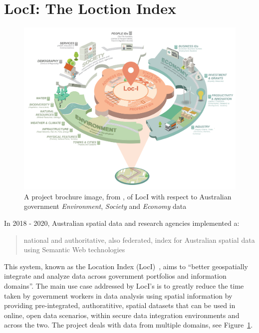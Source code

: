 \documentclass[runningheads]{llncs}
\begin{document}
\section{LocI: The Loction Index}\label{sec:loci}

\begin{figure}[htb]
    \centering
    \includegraphics[width=\linewidth]{images/loci-brochure.png}
    \caption{A project brochure image, from \cite{car_location_2019}, of LocI with respect to
    Australian government \textit{Environment}, \textit{Society} and \textit{Economy} data}
    \label{fig:loci-brochure}
\end{figure}

In 2018 - 2020, Australian spatial data and research agencies implemented a:

\begin{quotation}
    national and authoritative, also federated, index for Australian spatial data using Semantic Web technologies~\cite{car_location_2019}
\end{quotation}

This system, known as the Location Index (LocI)~\cite{car_location_2019}, aims to ``better geospatially integrate and analyze data across 
government portfolios and information domains''. The main use case addressed by LocI's is to greatly reduce the time taken by government 
workers in data analysis using spatial information by providing pre-integrated, authoratitive, spatial datasets that can be used in 
online, open data scenarios, within secure data integration environments and across the two. The project deals with data from multiple domains,
see Figure~\ref{fig:loci-brochure}.
\end{document}
